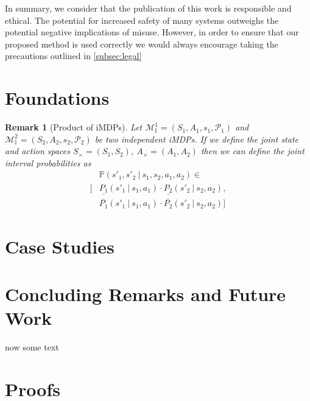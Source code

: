 \documentclass[twoside,twocolumn]{article}
\newtheorem{remark}{Remark}
\newcommand\given[1][]{\:#1\vert\:}
\begin{document}
In summary, we consider that the publication of this work is responsible and ethical. The potential for increased safety of many systems outweighs the potential negative implications of misuse. However, in order to ensure that our proposed method is used correctly we would always encourage taking the precautions outlined in \autoref{subsec:legal}

\section{Foundations}

\begin{remark}[Product of iMDPs]
	Let $\mathcal{M}^1_\mathbb{I}=(S_1,A_1,s_1,\mathcal{P}_1)$ and $\mathcal{M}^2_\mathbb{I}=(S_2,A_2,s_2,\mathcal{P}_2)$ be two independent iMDPs. If we define the joint state and action spaces $S_\times=(S_1,S_2)$, $A_\times=(A_1,A_2)$ then we can define the joint interval probabilities as
\begin{equation}
	\begin{aligned}
	&\mathbb{P}(s'_1,s'_2 \given s_1,s_2,a_1,a_2) \in \\
	[&\underline{P_1}(s'_1 \given s_1,a_1) \cdot \underline{P_2}(s'_2\given s_2,a_2),\\
	 &\overline{P_1}(s'_1 \given s_1,a_1) \cdot \overline{P_2}(s'_2 \given s_2,a_2)]
	\end{aligned}
\end{equation}
\end{remark}


\section{Case Studies}

\section{Concluding Remarks and Future Work}
now some text


\appendix
\section{Proofs}
\end{document}

